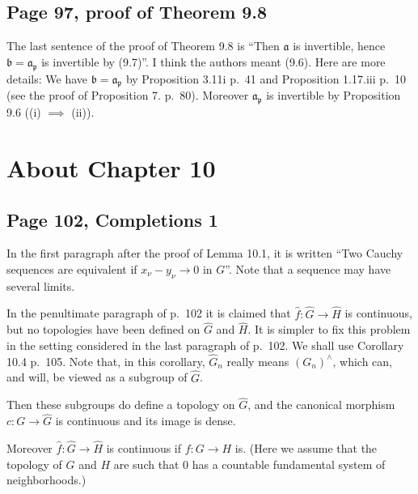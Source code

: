 \documentclass[parskip=half,fontsize=12pt]{scrartcl}%
\newcommand{\mf}{\mathfrak}
\newcommand{\ppp}{\mf p}
\begin{document}
\subsection{Page 97, proof of Theorem 9.8}%

The last sentence of the proof of Theorem 9.8 is ``Then $\mf a$ is invertible, hence $\mf b=\mf a_\ppp$ is invertible by (9.7)''. I think the authors meant (9.6). Here are more details: We have $\mf b=\mf a_\ppp$ by Proposition 3.11i p.~41 and Proposition 1.17.iii p.~10 (see the proof of Proposition 7. p.~80). Moreover $\mf a_\ppp$ is invertible by Proposition 9.6 ((i) $\implies$ (ii)).

\section{About Chapter 10}%

\subsection{Page 102, Completions 1}%

In the first paragraph after the proof of Lemma 10.1, it is written ``Two Cauchy sequences are equivalent if $x_\nu-y_\nu\to0$ in $G$''. Note that a sequence may have several limits.%

In the penultimate paragraph of p.~102 it is claimed that $\widehat f:\widehat G\to\widehat H$ is continuous, but no topologies have been defined on $\widehat G$ and $\widehat H$. It is simpler to fix this problem in the setting considered in the last paragraph of p.~102. We shall use Corollary 10.4 p.~105. Note that, in this corollary, $\widehat G_n$ really means $(G_n)^\wedge$, which can, and will, be viewed as a subgroup of $\widehat G$. 

Then these subgroups do define a topology on $\widehat G$, and the canonical morphism $c:G\to\widehat G$ is continuous and its image is dense. 

Moreover $\widehat f:\widehat G\to\widehat H$ is continuous if $f:G\to H$ is. (Here we assume that the topology of $G$ and $H$ are such that $0$ has a countable fundamental system of neighborhoods.)

\end{document}
